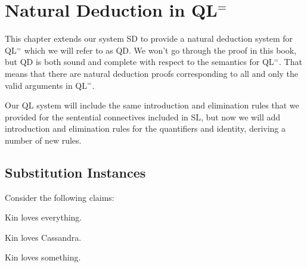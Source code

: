 ﻿%
\chapter{Natural Deduction in QL$^=$}
\label{ch.QLND}



This chapter extends our system SD to provide a natural deduction system for QL$^=$ which we will refer to as QD.
We won't go through the proof in this book, but QD is both sound and complete with respect to the semantics for QL$^=$.
That means that there are natural deduction proofs corresponding to all and only the valid arguments in QL$^=$.

Our QL system will include the same introduction and elimination rules that we provided for the sentential connectives included in SL, but now we will add introduction and elimination rules for the quantifiers and identity, deriving a number of new rules.



\section{Substitution Instances}


Consider the following claims:

\begin{earg}
  \item[\ex{I1}] Kin loves everything.
  \item[\ex{I2}] Kin loves Cassandra.
  \item[\ex{I3}] Kin loves something.
\end{earg}


